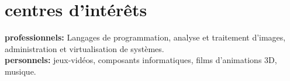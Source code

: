 \documentclass[]{friggeri-cv-a4} %
\begin{document}


\section{centres d'intérêts}

\textbf{professionnels:} Langages de programmation, analyse et traitement d'images, administration et virtualisation de systèmes. \\
\textbf{personnels:} jeux-vidéos, composants informatiques, films d'animations 3D, musique.
\end{document}

